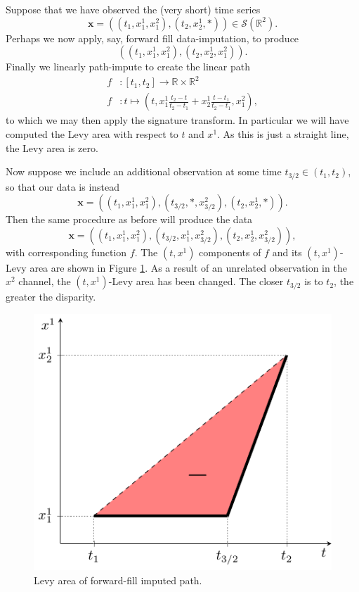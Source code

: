 \documentclass{article}
\newcommand{\reals}{\mathbb{R}}
\newcommand{\seriesspace}{\mathcal{S}}
\begin{document}
Suppose that we have observed the (very short) time series
\begin{equation}\label{eq:flaw1}
    \mathbf{x} = ((t_1, x_1^1, x_1^2), (t_2, x_2^1, *)) \in \seriesspace(\reals^2).
\end{equation}
Perhaps we now apply, say, forward fill data-imputation, to produce
\begin{equation*}
    ((t_1, x_1^1, x_1^2), (t_2, x_2^1, x_1^2)).
\end{equation*}
Finally we linearly path-impute to create the linear path
\begin{align*}
    f &\colon [t_1, t_2] \to \reals \times \reals^2\\
    f &\colon t \mapsto (t, x_1^1\frac{t_2 - t}{t_2 - t_1} + x_2^1\frac{t - t_1}{t_2 - t_1}, x_1^2),
\end{align*}
to which we may then apply the signature transform. In particular we will have computed the Levy area with respect to $t$ and $x^1$. As this is just a straight line, the Levy area is zero.

Now suppose we include an additional observation at some time $t_{3/2} \in (t_1, t_2)$, so that our data is instead
\begin{equation}\label{eq:flaw2}
    \mathbf{x} = ((t_1, x_1^1, x_1^2), (t_{3/2}, *, x_{3/2}^2), (t_2, x_2^1, *)).
\end{equation}
Then the same procedure as before will produce the data
\begin{equation*}
    \mathbf{x} = ((t_1, x_1^1, x_1^2), (t_{3/2}, x_1^1, x_{3/2}^2), (t_2, x_2^1, x_{3/2}^2)),
\end{equation*}
with corresponding function $f$. The $(t, x^1)$ components of $f$ and its $(t, x^1)$-Levy area are shown in Figure \ref{fig:bentline}. As a result of an unrelated observation in the $x^2$ channel, the $(t, x^1)$-Levy area has been changed. The closer $t_{3/2}$ is to $t_2$, the greater the disparity.
\begin{figure}
    \centering
    \includegraphics[width=0.45 \columnwidth]{figures/sig_path3.pdf}
    \caption{Levy area of forward-fill imputed path.}\label{fig:bentline}
    \vspace{-1em}
\end{figure}
\end{document}
